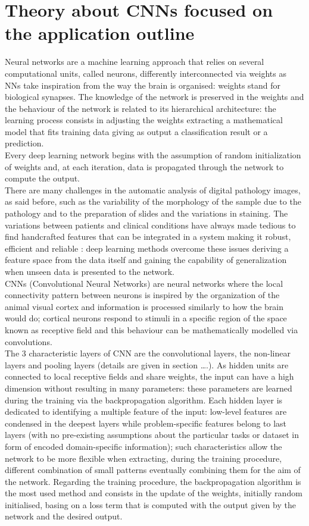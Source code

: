 \documentclass[12pt]{article}
\begin{document}
\section{Theory about CNNs focused on the application outline}
Neural networks are a machine learning approach that relies on several computational units, called neurons, differently interconnected via weights as NNs take inspiration from the way the brain is organised: weights stand for biological synapses. The knowledge of the network is preserved in the weights and the behaviour of the network is related to its hierarchical architecture: the learning process consists in adjusting the weights extracting a mathematical model that fits training data giving as output a classification result or a prediction.\\
Every deep learning network begins with the assumption of random initialization of weights and, at each iteration, data is propagated through the network to compute the output.\\ There are many challenges in the automatic analysis of digital pathology images, as said before, such as the variability of the morphology of the sample due to the pathology and to the preparation of slides and the variations in staining.
The variations between patients and clinical conditions have always made tedious to find handcrafted features that can be integrated in a system making it robust, efficient and reliable : deep learning methods overcome these issues deriving a feature space from the data itself and gaining the capability of generalization when unseen data is presented to the network.\\
CNNs (Convolutional Neural Networks) are neural networks where the local connectivity pattern between neurons is inspired by the organization of the animal visual cortex and information is processed similarly to how the brain would do; cortical neurons respond to stimuli in a specific region of the space known as receptive field and this behaviour can be mathematically modelled via convolutions.\\ The 3 characteristic layers of CNN are the convolutional layers, the non-linear layers and pooling layers (details are given in section ….). As hidden units are connected to local receptive fields and share weights, the input can have a high dimension without resulting in many parameters: these parameters are learned during the training via the backpropagation algorithm. Each hidden layer is dedicated to identifying a multiple feature of the input: low-level features are condensed in the deepest layers while problem-specific features belong to last layers (with no pre-existing assumptions about the particular tasks or dataset in form of encoded domain-specific information); such characteristics allow the network to be more flexible when extracting, during the training procedure, different combination of small patterns eventually combining them for the aim of the network. Regarding the training procedure, the backpropagation algorithm is the most used method and consists in the update of the weights, initially random initialised, basing on a loss term that is computed with the output given by the network and the desired output. \\
\end{document}

